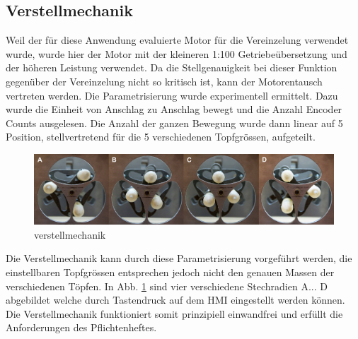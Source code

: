 \subsection{Verstellmechanik} \label{sec:Inbetriebnahme_Verstellmechanik}
Weil der für diese Anwendung evaluierte Motor für die Vereinzelung verwendet wurde, wurde hier der Motor mit der kleineren 1:100 Getriebeübersetzung und der höheren Leistung verwendet. Da die Stellgenauigkeit bei dieser Funktion gegenüber der Vereinzelung nicht so kritisch ist, kann der Motorentausch vertreten werden. Die Parametrisierung wurde experimentell ermittelt. Dazu wurde die Einheit von Anschlag zu Anschlag bewegt und die Anzahl Encoder Counts ausgelesen. Die Anzahl der ganzen Bewegung wurde dann linear auf 5 Position, stellvertretend für die 5 verschiedenen Topfgrössen, aufgeteilt. 

\begin{figure}[H]
	\includegraphics[draft=false,width=1\textwidth]{Illustrationen/7-Inbetriebnahme_und_Kalibration/verstellmechanik_1.jpg}
	\caption{verstellmechanik}
	\label{fig:verstellmechanik}
\end{figure}

Die Verstellmechanik kann durch diese Parametrisierung vorgeführt werden, die einstellbaren Topfgrössen entsprechen jedoch nicht den genauen Massen der verschiedenen Töpfen. In Abb. \ref{fig:verstellmechanik} sind vier verschiedene Stechradien A... D abgebildet welche durch Tastendruck auf dem HMI eingestellt werden können.
\newline
Die Verstellmechanik funktioniert somit prinzipiell einwandfrei und erfüllt die Anforderungen des Pflichtenheftes.
